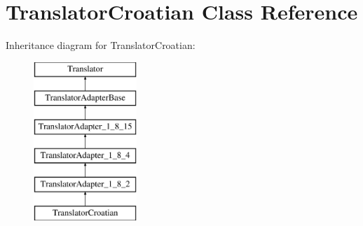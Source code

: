 \hypertarget{class_translator_croatian}{}\section{Translator\+Croatian Class Reference}
\label{class_translator_croatian}
Inheritance diagram for Translator\+Croatian\+:\begin{figure}[H]
\begin{center}
\leavevmode
\includegraphics[height=6.000000cm]{class_translator_croatian}
\end{center}
\end{figure}
